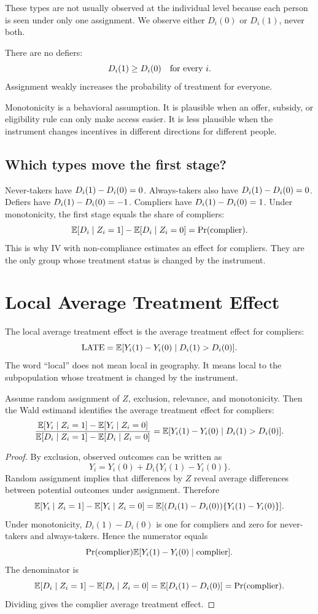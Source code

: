 These types are not usually observed at the individual level because each
person is seen under only one assignment. We observe either $D_i(0)$ or
$D_i(1)$, never both.

\begin{assN}[Monotonicity]
There are no defiers:
\[
    D_i(1) \geq D_i(0)
    \quad \text{for every } i.
\]
Assignment weakly increases the probability of treatment for everyone.
\end{assN}

Monotonicity is a behavioral assumption. It is plausible when an offer, subsidy,
or eligibility rule can only make access easier. It is less plausible when the
instrument changes incentives in different directions for different people.

\subsection{Which types move the first stage?}

Never-takers have $D_i(1)-D_i(0)=0$. Always-takers also have
$D_i(1)-D_i(0)=0$. Defiers have $D_i(1)-D_i(0)=-1$. Compliers have
$D_i(1)-D_i(0)=1$. Under monotonicity, the first stage equals the share of
compliers:
\[
    \mathbb{E}[D_i\mid Z_i=1] - \mathbb{E}[D_i\mid Z_i=0]
    =
    \Pr(\text{complier}).
\]
This is why IV with non-compliance estimates an effect for compliers. They are
the only group whose treatment status is changed by the instrument.

\section{Local Average Treatment Effect}

The local average treatment effect is the average treatment effect for
compliers:
\[
    \mathrm{LATE}
    =
    \mathbb{E}[Y_i(1)-Y_i(0) \mid D_i(1) > D_i(0)].
\]
The word ``local'' does not mean local in geography. It means local to the
subpopulation whose treatment is changed by the instrument.

\begin{thmN}
Assume random assignment of $Z$, exclusion, relevance, and monotonicity. Then
the Wald estimand identifies the average treatment effect for compliers:
\[
    \frac{\mathbb{E}[Y_i\mid Z_i=1]-\mathbb{E}[Y_i\mid Z_i=0]}
         {\mathbb{E}[D_i\mid Z_i=1]-\mathbb{E}[D_i\mid Z_i=0]}
    =
    \mathbb{E}[Y_i(1)-Y_i(0) \mid D_i(1)>D_i(0)].
\]
\end{thmN}

\begin{proof}
By exclusion, observed outcomes can be written as
\[
    Y_i = Y_i(0) + D_i\{Y_i(1)-Y_i(0)\}.
\]
Random assignment implies that differences by $Z$ reveal average differences
between potential outcomes under assignment. Therefore
\[
    \mathbb{E}[Y_i\mid Z_i=1]-\mathbb{E}[Y_i\mid Z_i=0]
    =
    \mathbb{E}[(D_i(1)-D_i(0))\{Y_i(1)-Y_i(0)\}].
\]
Under monotonicity, $D_i(1)-D_i(0)$ is one for compliers and zero for
never-takers and always-takers. Hence the numerator equals
\[
    \Pr(\text{complier})
    \mathbb{E}[Y_i(1)-Y_i(0)\mid \text{complier}].
\]
The denominator is
\[
    \mathbb{E}[D_i\mid Z_i=1]-\mathbb{E}[D_i\mid Z_i=0]
    =
    \mathbb{E}[D_i(1)-D_i(0)]
    =
    \Pr(\text{complier}).
\]
Dividing gives the complier average treatment effect.
\end{proof}

